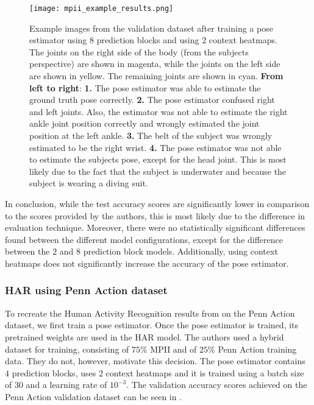 \begin{figure}[htb!]
    \centering
    \texttt{[image: mpii\_example\_results.png]}
    \caption{Example images from the validation dataset after training a pose estimator using $8$ prediction blocks and using $2$ context heatmaps. The joints on the right side of the body (from the subjects perspective) are shown in magenta, while the joints on the left side are shown in yellow. The remaining joints are shown in cyan. \textbf{From left to right}: \textbf{1.} The pose estimator was able to estimate the ground truth pose correctly. \textbf{2.} The pose estimator confused right and left joints. Also, the estimator was not able to estimate the right ankle joint position correctly and wrongly estimated the joint position at the left ankle. \textbf{3.} The belt of the subject was wrongly estimated to be the right wrist. \textbf{4.} The pose estimator was not able to estimate the subjects pose, except for the head joint. This is most likely due to the fact that the subject is underwater and because the subject is wearing a diving suit.}
    \label{fig:mpii_example_results}
\end{figure}
In conclusion, while the test accuracy scores are significantly lower in comparison to the scores provided by the authors, this is most likely due to the difference in evaluation technique.
Moreover, there were no statistically significant differences found between the different model configurations, except for the difference between the $2$ and $8$ prediction block models.
Additionally, using context heatmaps does not significantly increase the accuracy of the pose estimator.

\subsubsection{HAR using Penn Action dataset}
To recreate the Human Activity Recognition results from \cite{luvizon_2d/3d_2018} on the Penn Action dataset, we first train a pose estimator.
Once the pose estimator is trained, its pretrained weights are used in the HAR model.
The authors used a hybrid dataset for training, consisting of $75\%$ MPII and of $25\%$ Penn Action training data.
They do not, however, motivate this decision.
The pose estimator contains $4$ prediction blocks, uses $2$ context heatmaps and it is trained using a batch size of $30$ and a learning rate of $10^{-3}$.
The validation accuracy scores achieved on the Penn Action validation dataset can be seen in .


